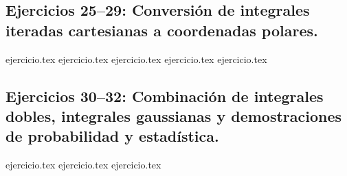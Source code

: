 \subsection*{Ejercicios 25--29: Conversión de integrales iteradas cartesianas a coordenadas polares.}
\begin{enumerate}
    \setcounter{enumi}{24}
    {ejercicio.tex}
    {ejercicio.tex}
    {ejercicio.tex}
    {ejercicio.tex}
    {ejercicio.tex}
\end{enumerate}

\subsection*{Ejercicios 30--32: Combinación de integrales dobles, integrales gaussianas y demostraciones de probabilidad y estadística.}
\begin{enumerate}
    \setcounter{enumi}{29}
    {ejercicio.tex}
    {ejercicio.tex}
    {ejercicio.tex}
\end{enumerate}
